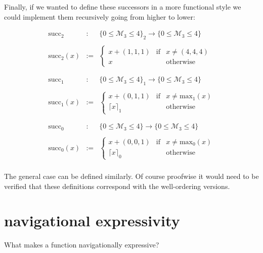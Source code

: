 \documentclass[twoside]{article}
\begin{document}
Finally, if we wanted to define these successors in a more functional style we could implement
them recursively going from higher to lower:

$$ \begin{array}{rll}
\mbox{succ}_2		& :	& \{0\le\mathcal{M}_3\le 4\}_2\to\{0\le\mathcal{M}_3\le 4\}			\\
														\\
\mbox{succ}_2(x)	& :=	& \left\{\begin{array}{lcl}
				  x + (1,1,1)	& \mbox{if}	& x\neq (4,4,4)					\\
				  x		& 		& \mbox{otherwise}
				  \end{array}\right.								\\
														\\
														\\
\mbox{succ}_1		& :	& \{0\le\mathcal{M}_3\le 4\}_1\to\{0\le\mathcal{M}_3\le 4\}			\\
														\\
\mbox{succ}_1(x)	& :=	& \left\{\begin{array}{lcl}
				  x + (0,1,1)	& \mbox{if}	& x\neq\mbox{max}_1(x)				\\
				  \lceil x\rceil_1& 		& \mbox{otherwise}
				  \end{array}\right.								\\
														\\
														\\
\mbox{succ}_0		& :	& \{0\le\mathcal{M}_3\le 4\}\to\{0\le\mathcal{M}_3\le 4\}			\\
														\\
\mbox{succ}_0(x)	& :=	& \left\{\begin{array}{lcl}
				  x + (0,0,1)	& \mbox{if}	& x\neq\mbox{max}_0(x)				\\
				  \lceil x\rceil_0& 		& \mbox{otherwise}
				  \end{array}\right.								\\
\end{array} $$

The general case can be defined similarly. Of course proofwise it would need to be verified that these definitions
correspond with the well-ordering versions.

\section*{navigational expressivity}

What makes a function navigationally expressive?
\end{document}
